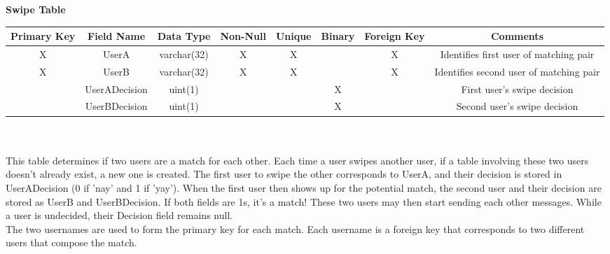 \documentclass{article}
\begin{document}
\begin{enumerate}
        \textbf{Swipe Table}\\
        \begin{adjustbox}{width=1.2\textwidth}
            \begin{tabular}{|c|c|c|c|c|c|c|c|}
                \hline
                Primary Key & Field Name & Data Type & Non-Null & Unique & Binary & Foreign Key & Comments \\ \hline
                X & UserA & varchar(32) & X & X &  & X & Identifies first user of matching pair\\ \hline
                X & UserB & varchar(32) & X & X &  & X & Identifies second user of matching pair\\ \hline
                 & UserADecision & uint(1) &  &  & X &  & First user's swipe decision\\ \hline
                 & UserBDecision & uint(1) &  &  & X &  & Second user's swipe decision\\ \hline
            \end{tabular}
        \end{adjustbox}\\\\
        This table determines if two users are a match for each other. Each time a user swipes another user, if a table involving these two users doesn't already exist, a new one is created. The first user to swipe the other corresponds to UserA, and their decision is stored in UserADecision (0 if 'nay' and 1 if 'yay'). When the first user then shows up for the potential match, the second user and their decision are stored as UserB and UserBDecision. If both fields are 1s, it's a match! These two users may then start sending each other messages. While a user is undecided, their Decision field remains null.\\
        The two usernames are used to form the primary key for each match. Each username is a foreign key that corresponds to two different users that compose the match.\\\\
        

\end{enumerate}
\end{document}
